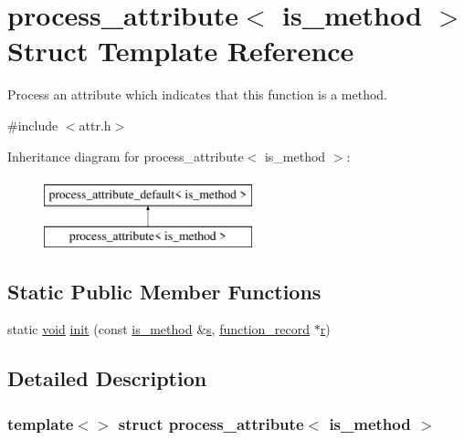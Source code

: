 \hypertarget{structprocess__attribute_3_01is__method_01_4}{}\section{process\+\_\+attribute$<$ is\+\_\+method $>$ Struct Template Reference}
\label{structprocess__attribute_3_01is__method_01_4}


Process an attribute which indicates that this function is a method.  




{\ttfamily \#include $<$attr.\+h$>$}

Inheritance diagram for process\+\_\+attribute$<$ is\+\_\+method $>$\+:\begin{figure}[H]
\begin{center}
\leavevmode
\includegraphics[height=2.000000cm]{structprocess__attribute_3_01is__method_01_4}
\end{center}
\end{figure}
\subsection*{Static Public Member Functions}
\begin{DoxyCompactItemize}
\item 
static \mbox{\hyperlink{_s_d_l__opengles2__gl2ext_8h_ae5d8fa23ad07c48bb609509eae494c95}{void}} \mbox{\hyperlink{structprocess__attribute_3_01is__method_01_4_a98ee80635d5dde17c53ce800e08c2a04}{init}} (const \mbox{\hyperlink{structis__method}{is\+\_\+method}} \&\mbox{\hyperlink{_s_d_l__opengl_8h_a4af680a6c683f88ed67b76f207f2e6e4}{s}}, \mbox{\hyperlink{structfunction__record}{function\+\_\+record}} $\ast$\mbox{\hyperlink{_s_d_l__opengl_8h_a42ce7cdc612e53abee15043f80220d97}{r}})
\end{DoxyCompactItemize}


\subsection{Detailed Description}
\subsubsection*{template$<$$>$\newline
struct process\+\_\+attribute$<$ is\+\_\+method $>$}

